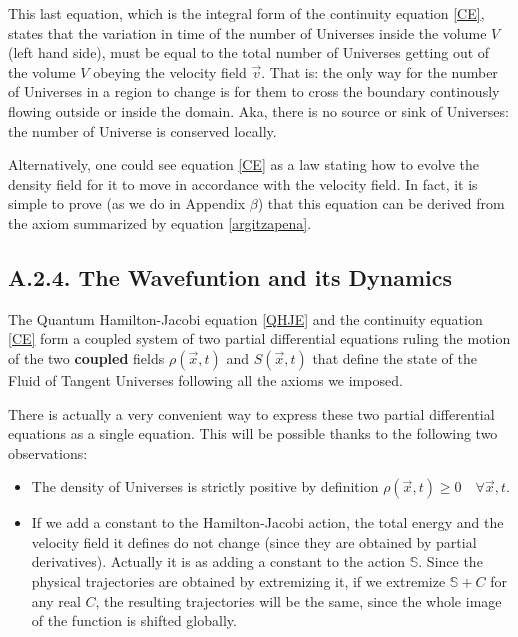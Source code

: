 \documentclass[11pt, a4paper]{article} %
\newcommand{\s}{\mathbb{S}}
\begin{document}
This last equation, which is the integral form of the continuity equation \eqref{CE}, states that the variation in time of the number of Universes inside the volume $V$ (left hand side), must be equal to the total number of Universes getting out of the volume $V$ obeying the velocity field $\vec{v}$. That is: the only way for the number of Universes in a region to change is for them to cross the boundary continously flowing outside or inside the domain. Aka, there is no source or sink of Universes: the number of Universe is conserved locally.

Alternatively, one could see equation \eqref{CE} as a law stating how to evolve the density field for it to move in accordance with the velocity field. In fact, it is simple to prove (as we do in Appendix $\beta$) that this equation can be derived from the axiom summarized by equation \eqref{argitzapena}.



\subsection*{A.2.4. The Wavefuntion and its Dynamics}


The Quantum Hamilton-Jacobi equation \eqref{QHJE} and the continuity equation \eqref{CE} form a coupled system of two partial differential equations ruling the motion of the two {\bf coupled} fields $\rho(\vec{x},t)$ and $S(\vec{x},t)$ that define the state of the Fluid of Tangent Universes following all the axioms we imposed.

There is actually a very convenient way to express these two partial differential equations as a single equation. This will be possible thanks to the following two observations:
\begin{itemize}
\item The density of Universes is strictly positive by definition $\rho(\vec{x},t)\geq 0\quad \forall\vec{x},t$.

\item If we add a constant to the Hamilton-Jacobi action, the total energy and the velocity field it defines do not change (since they are obtained by partial derivatives). Actually it is as adding a constant to the action $\s$. Since the physical trajectories are obtained by extremizing it, if we extremize $\s+C$ for any real $C$, the resulting trajectories will be the same, since the whole image of the function is shifted globally.
\end{itemize}
\end{document}
